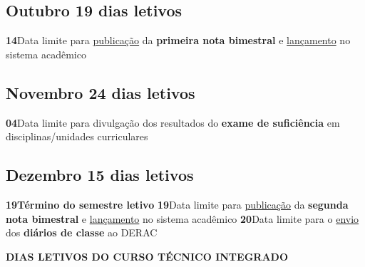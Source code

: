 \documentclass[thesis]{hmcposter}
\begin{document}
\begin{poster}
\subsection{Outubro \hfill 19 dias letivos}\textbf{14}\qquad Data limite para \underline{publicação} da \textbf{primeira nota bimestral} e \underline{lançamento} no sistema acadêmico \newline \null\subsection{Novembro \hfill 24 dias letivos}\textbf{04}\qquad Data limite para divulgação dos resultados do \textbf{exame de suficiência} em disciplinas/unidades curriculares \newline \null\subsection{Dezembro \hfill 15 dias letivos}\textbf{19}\qquad \textbf{Término do semestre letivo} \newline \null\textbf{19}\qquad Data limite para \underline{publicação} da \textbf{segunda nota bimestral} e \underline{lançamento} no sistema acadêmico \newline \null\textbf{20}\qquad Data limite para o \underline{envio} dos \textbf{diários de classe} ao DERAC \newline \null\newpage
~
\vfill
\begin{center}
\large \textbf{DIAS LETIVOS DO CURSO TÉCNICO INTEGRADO}
\newline
\null
\newline
\begin{table}
\centering
{}
\end{table}
\newline
\null
\newline
\end{center}

\end{poster}
\end{document}
